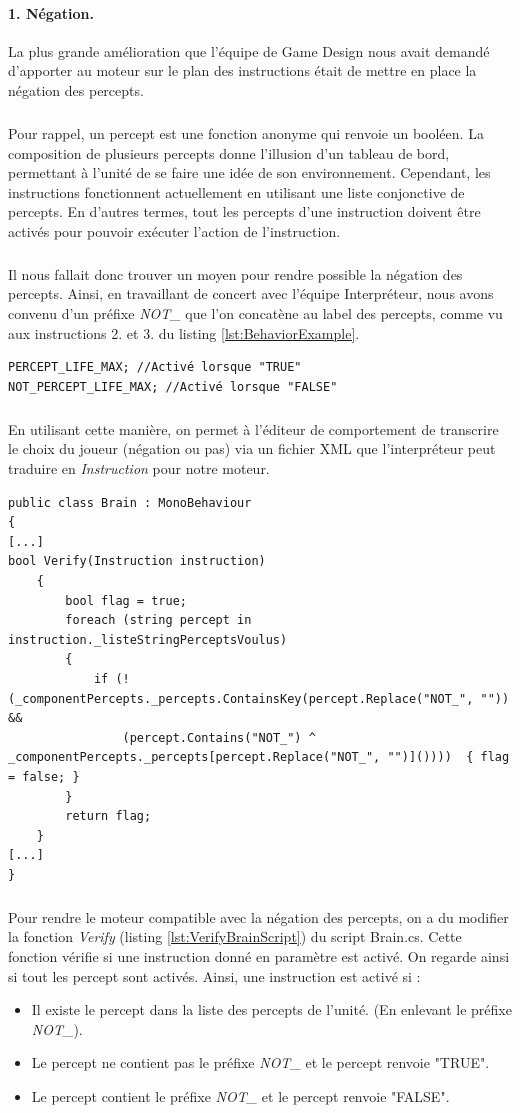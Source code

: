 \documentclass{report}
\begin{document}
\paragraph{1. Négation.}
La plus grande amélioration que l'équipe de Game Design nous avait demandé d'apporter au moteur sur le plan des instructions était de mettre en place la négation des percepts.
\subparagraph{} Pour rappel, un percept est une fonction anonyme qui renvoie un booléen. La composition de plusieurs percepts donne l'illusion d'un tableau de bord, permettant à l'unité de se faire une idée de son environnement. Cependant, les instructions fonctionnent actuellement en utilisant une liste conjonctive de percepts. En d'autres termes, tout les percepts d'une instruction doivent être activés pour pouvoir exécuter l'action de l'instruction.
\subparagraph{}Il nous fallait donc trouver un moyen pour rendre possible la négation des percepts. Ainsi, en travaillant de concert avec l'équipe Interpréteur, nous avons convenu d'un préfixe \textit{NOT\_} que l'on concatène au label des percepts, comme vu aux instructions 2. et 3. du listing \ref{lst:BehaviorExample}.
\begin{lstlisting}[label={lst:BehaviorExampleNeg}, caption = Un percept et son inverse.]
PERCEPT_LIFE_MAX; //Activé lorsque "TRUE"
NOT_PERCEPT_LIFE_MAX; //Activé lorsque "FALSE"
\end{lstlisting}

\subparagraph{}En utilisant cette manière, on permet à l'éditeur de comportement de transcrire le choix du joueur (négation ou pas) via un fichier XML que l’interpréteur peut traduire en \textit{Instruction} pour notre moteur.

\begin{lstlisting}[language={[Sharp]C},label={lst:VerifyBrainScript}, caption=  Extrait du code du script Brain.cs]
public class Brain : MonoBehaviour
{
[...]
bool Verify(Instruction instruction)
    {
        bool flag = true;
        foreach (string percept in instruction._listeStringPerceptsVoulus)
        {
            if (!(_componentPercepts._percepts.ContainsKey(percept.Replace("NOT_", "")) && 
                (percept.Contains("NOT_") ^ _componentPercepts._percepts[percept.Replace("NOT_", "")]())))  { flag = false; }
        }
        return flag;
    }
[...]
}
\end{lstlisting}

\subparagraph{}Pour rendre le moteur compatible avec la négation des percepts, on a du modifier la fonction \textit{Verify} (listing \ref{lst:VerifyBrainScript}) du script Brain.cs. Cette fonction vérifie si une instruction donné en paramètre est activé. On regarde ainsi si tout les percept sont activés. \newline
Ainsi, une instruction est activé si :
\begin{itemize}
\item Il existe le percept dans la liste des percepts de l'unité. (En enlevant le préfixe \textit{NOT\_}).
\item Le percept ne contient pas le préfixe \textit{NOT\_} et le percept renvoie "TRUE".
\item Le percept contient le préfixe \textit{NOT\_} et le percept renvoie "FALSE".
\end{itemize}
\end{document}

